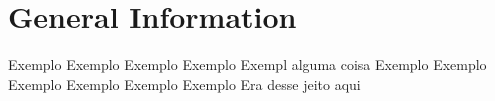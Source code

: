 \section{General Information}

Exemplo Exemplo Exemplo Exemplo\cite{boulic:91} Exempl alguma coisa Exemplo Exemplo Exemplo Exemplo Exemplo Exemplo 
Era desse jeito aqui

